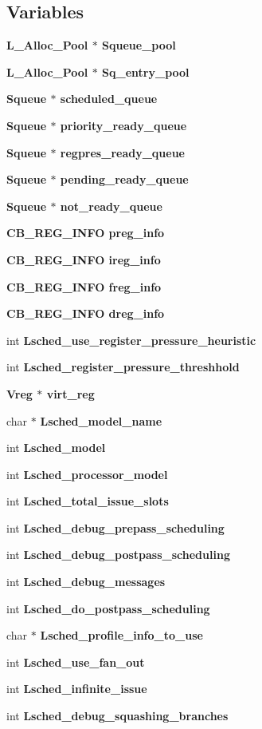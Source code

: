 \subsection*{Variables}
\begin{CompactItemize}
\item 
\bf{L\_\-Alloc\_\-Pool} $\ast$ \bf{Squeue\_\-pool}
\item 
\bf{L\_\-Alloc\_\-Pool} $\ast$ \bf{Sq\_\-entry\_\-pool}
\item 
\bf{Squeue} $\ast$ \bf{scheduled\_\-queue}
\item 
\bf{Squeue} $\ast$ \bf{priority\_\-ready\_\-queue}
\item 
\bf{Squeue} $\ast$ \bf{regpres\_\-ready\_\-queue}
\item 
\bf{Squeue} $\ast$ \bf{pending\_\-ready\_\-queue}
\item 
\bf{Squeue} $\ast$ \bf{not\_\-ready\_\-queue}
\item 
\bf{CB\_\-REG\_\-INFO} \bf{preg\_\-info}
\item 
\bf{CB\_\-REG\_\-INFO} \bf{ireg\_\-info}
\item 
\bf{CB\_\-REG\_\-INFO} \bf{freg\_\-info}
\item 
\bf{CB\_\-REG\_\-INFO} \bf{dreg\_\-info}
\item 
int \bf{Lsched\_\-use\_\-register\_\-pressure\_\-heuristic}
\item 
int \bf{Lsched\_\-register\_\-pressure\_\-threshhold}
\item 
\bf{Vreg} $\ast$ \bf{virt\_\-reg}
\item 
char $\ast$ \bf{Lsched\_\-model\_\-name}
\item 
int \bf{Lsched\_\-model}
\item 
int \bf{Lsched\_\-processor\_\-model}
\item 
int \bf{Lsched\_\-total\_\-issue\_\-slots}
\item 
int \bf{Lsched\_\-debug\_\-prepass\_\-scheduling}
\item 
int \bf{Lsched\_\-debug\_\-postpass\_\-scheduling}
\item 
int \bf{Lsched\_\-debug\_\-messages}
\item 
int \bf{Lsched\_\-do\_\-postpass\_\-scheduling}
\item 
char $\ast$ \bf{Lsched\_\-profile\_\-info\_\-to\_\-use}
\item 
int \bf{Lsched\_\-use\_\-fan\_\-out}
\item 
int \bf{Lsched\_\-infinite\_\-issue}
\item 
int \bf{Lsched\_\-debug\_\-squashing\_\-branches}

\end{CompactItemize}
